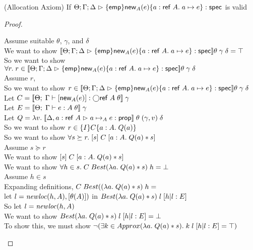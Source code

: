 \begin{lemma}{(Allocation Axiom)}
If $\judgeS{\spec{\emp}{\newref{A}{e}}{a:\reftype{A}}{a \pointsto e}}$ is valid
\end{lemma}
\begin{proof}
  \begin{tabbedproof}
    \oo Assume suitable $\theta$, $\gamma$, and $\delta$ \\
    \ooo We want to show $\interp{\judgeS{\spec{\emp}{\newref{A}{e}}{a:\reftype{A}}{a \pointsto e}}}\theta\;\gamma\;\delta = \top$ \\
    \ooo So we want to show $\forall r.\; r \in \interp{\judgeS{\spec{\emp}{\newref{A}{e}}{a:\reftype{A}}{a \pointsto e}}}\theta\;\gamma\;\delta$ \\
    \ooo Assume $r$, \\
    \oooo So we want to show $r \in \interp{\judgeS{\spec{\emp}{\newref{A}{e}}{a:\reftype{A}}{a \pointsto e}}}\theta\;\gamma\;\delta$ \\
    \oooo Let $C = \interp{\judgeE{\Gamma}{\comp{\newref{A}{e}}}{\monad{\reftype{A}}}\;\theta}\;\gamma$ \\
    \oooo Let $E = \interp{\judgeE{\Gamma}{e}{A}\;\theta}\;\gamma$ \\
    \oooo Let $Q = \semfun{v}{\interp{\judgeA[\Delta, a:\reftype{A}]{a \pointsto_A e}{\assert}}\;\theta\;(\gamma, v)\;\delta}$ \\
    \oooo So we want to show $r \in \spec{I}{C}{a:A}{Q(a)}$ \\
    \oooo So we want to show $\forall s \succeq r.\; \basicspec{s}{C}{a:A}{Q(a)*s}$ \\
    \oooo Assume $s \succeq r$ \\
    \ooooo We want to show $\basicspec{s}{C}{a:A}{Q(a)*s}$ \\
    \ooooo We want to show $\forall h \in s.\; C\;Best(\semfun{a}{Q(a)*s})\;h = \bot$ \\
    \ooooo Assume $h \in s$ \\
    \oooooo Expanding definitions, $C\;Best((\semfun{a}{Q(a)*s})\;h = $ \\
    \oooooox let $l = \newloc{h}{A}, [\theta(A)])$ in $Best(\semfun{a}{Q(a)*s})\;l\;[h|l:E]$ \\
    \oooooo So let $l = \newloc{h}{A}$ \\
    \oooooo We want to show $Best(\semfun{a}{Q(a)*s})\;l\;[h|l:E] = \bot$ \\
    \oooooo To show this, we must show $\lnot (\exists k \in Approx(\semfun{a}{Q(a)*s}).\;k\;l\;[h|l:E] = \top)$ \\

\end{tabbedproof}
\end{proof}
